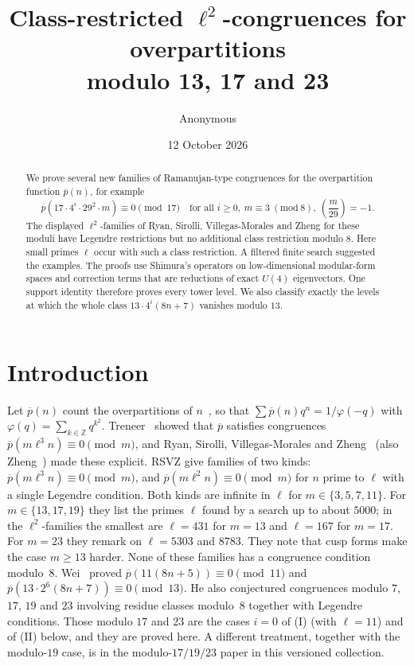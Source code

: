 \documentclass[11pt]{article}
\title{Class-restricted $\ell^2$-congruences for overpartitions\\ modulo 13, 17 and 23}
\author{Anonymous}\date{12 October 2026}
\theoremstyle{remark}\newtheorem{remark}[theorem]{Remark}
\newcommand{\pb}{\overline{p}}
\newcommand{\leg}[2]{\left(\frac{#1}{#2}\right)}
\begin{document}
\maketitle\sloppy
\begin{abstract}
We prove several new families of Ramanujan-type congruences for the overpartition function $\pb(n)$, for example
\[\pb(17\cdot4^i\cdot29^2\cdot m)\equiv0\pmod{17}\quad\text{for all }i\ge0,\ m\equiv3\ (\mathrm{mod}\ 8),\ \leg m{29}=-1.\]
The displayed $\ell^2$-families of Ryan, Sirolli, Villegas-Morales and Zheng for these moduli have Legendre restrictions but no additional class restriction modulo $8$. Here small primes $\ell$ occur with such a class restriction. A filtered finite search suggested the examples. The proofs use Shimura's operators on low-dimensional modular-form spaces and correction terms that are reductions of exact $U(4)$ eigenvectors. One support identity therefore proves every tower level. We also classify exactly the levels at which the whole class $13\cdot4^i(8n+7)$ vanishes modulo $13$.
\end{abstract}

\section{Introduction}
Let $\pb(n)$ count the overpartitions of $n$~\cite{CL}, so that $\sum\pb(n)q^n=1/\varphi(-q)$ with $\varphi(q)=\sum_{k\in\mathbb Z}q^{k^2}$. Treneer~\cite{Treneer} showed that $\pb$ satisfies congruences $\pb(m\ell^3n)\equiv0\pmod m$, and Ryan, Sirolli, Villegas-Morales and Zheng~\cite{RSVZ} (also Zheng~\cite{Zheng}) made these explicit. RSVZ give families of two kinds: $\pb(m\ell^3n)\equiv0\pmod m$, and $\pb(m\ell^2n)\equiv0\pmod m$ for $n$ prime to $\ell$ with a single Legendre condition. Both kinds are infinite in $\ell$ for $m\in\{3,5,7,11\}$. For $m\in\{13,17,19\}$ they list the primes $\ell$ found by a search up to about $5000$; in the $\ell^2$-families the smallest are $\ell=431$ for $m=13$ and $\ell=167$ for $m=17$. For $m=23$ they remark on $\ell=5303$ and $8783$. They note that cusp forms make the case $m\ge13$ harder. None of these families has a congruence condition modulo~$8$. Wei~\cite{Wei} proved $\pb(11(8n+5))\equiv0\pmod{11}$ and $\pb(13\cdot2^6(8n+7))\equiv0\pmod{13}$. He also conjectured congruences modulo $7$, $17$, $19$ and $23$ involving residue classes modulo~$8$ together with Legendre conditions. Those modulo $17$ and $23$ are the cases $i=0$ of (I) (with $\ell=11$) and of (II) below, and they are proved here. A different treatment, together with the modulo-$19$ case, is in the modulo-$17/19/23$ paper in this versioned collection.
\end{document}
